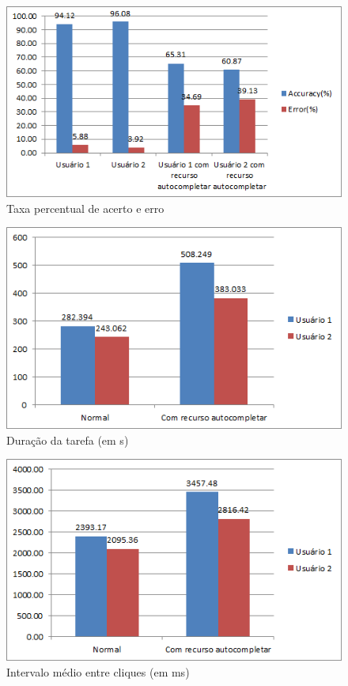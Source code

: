 \documentclass[twoside]{article}
\begin{document}
\begin{multicols}{2}
\begin{figure}[H]
\label{fig:graph_tx}
  \caption{Taxa percentual de acerto e erro}
  \centering
    \includegraphics[scale = 0.50]{graph_acertoerro.png}
\end{figure}

\begin{figure}[H]
\label{fig:graph_d}
  \caption{Duração da tarefa (em s)}
  \centering
    \includegraphics[scale = 0.50]{graph_duracao.png}
\end{figure}

\begin{figure}[H]
\label{fig:graph_int}
  \caption{Intervalo médio entre cliques (em ms)}
  \centering
    \includegraphics[scale = 0.50]{graph_intervalomed.png}
\end{figure}


\end{multicols}
\end{document}
